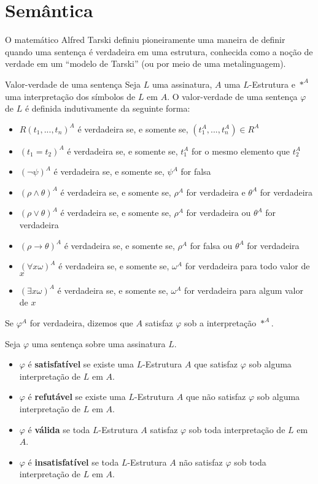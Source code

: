 \chapter{Semântica}

O matemático Alfred Tarski definiu pioneiramente uma maneira de definir quando uma sentença é verdadeira em uma estrutura, conhecida como a noção de verdade em um ``modelo de Tarski'' (ou por meio de uma metalinguagem).

\begin{definition}{Valor-verdade de uma sentença}
    Seja $L$ uma assinatura, $A$ uma $L$-Estrutura e $*^A$ uma interpretação dos símbolos de $L$ em $A$. O valor-verdade de uma sentença $\varphi$ de $L$ é definida indutivamente da seguinte forma:
    \begin{itemize}
        \item $R(t_1,...,t_n)^A$ é verdadeira se, e somente se, $(t_1^A,...,t_n^A) \in R^A$
        \item $(t_1 = t_2)^A$ é verdadeira se, e somente se, $t_1^A$ for o mesmo elemento que $t_2^A$
        \item $(\neg \psi)^A$ é verdadeira se, e somente se, $\psi^A$ for falsa
        \item $(\rho \land \theta)^A$ é verdadeira se, e somente se, $\rho^A$ for verdadeira e $\theta^A$ for verdadeira
        \item $(\rho \lor \theta)^A$ é verdadeira se, e somente se, $\rho^A$ for verdadeira ou $\theta^A$ for verdadeira
        \item $(\rho \rightarrow \theta)^A$ é verdadeira se, e somente se, $\rho^A$ for falsa ou $\theta^A$ for verdadeira
        \item $(\forall x \omega)^A$ é verdadeira se, e somente se, $\omega^A$ for verdadeira para todo valor de $x$
        \item $(\exists x \omega)^A$ é verdadeira se, e somente se, $\omega^A$ for verdadeira para algum valor de $x$
    \end{itemize}
    Se $\varphi^A$ for verdadeira, dizemos que $A$ satisfaz $\varphi$ sob a interpretação $*^A$.

    Seja $\varphi$ uma sentença sobre uma assinatura $L$.
    \begin{itemize}
        \item $\varphi$ é \textbf{satisfatível} se existe uma $L$-Estrutura $A$ que satisfaz $\varphi$ sob alguma interpretação de $L$ em $A$.
        \item $\varphi$ é \textbf{refutável} se existe uma $L$-Estrutura $A$ que não satisfaz $\varphi$ sob alguma interpretação de $L$ em $A$.
        \item $\varphi$ é \textbf{válida} se toda $L$-Estrutura $A$ satisfaz $\varphi$ sob toda interpretação de $L$ em $A$.
        \item $\varphi$ é \textbf{insatisfatível} se toda $L$-Estrutura $A$ não satisfaz $\varphi$ sob toda interpretação de $L$ em $A$.
    \end{itemize}


\end{definition}
